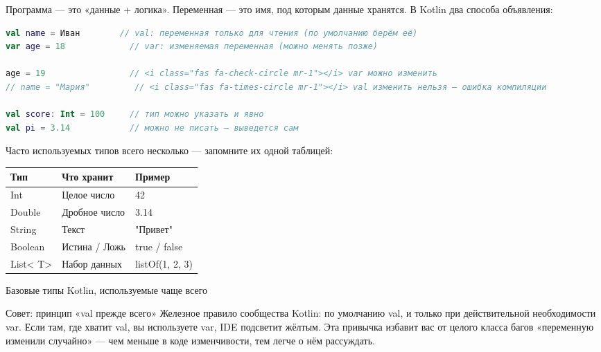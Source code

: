 


Программа — это «данные + логика». Переменная — это имя, под которым данные хранятся. В Kotlin два способа объявления:

\begin{lstlisting}[language=Kotlin]
val name = Иван        // val: переменная только для чтения (по умолчанию берём её)
var age = 18             // var: изменяемая переменная (можно менять позже)

age = 19                 // <i class="fas fa-check-circle mr-1"></i> var можно изменить
// name = "Мария"         // <i class="fas fa-times-circle mr-1"></i> val изменить нельзя — ошибка компиляции

val score: Int = 100     // тип можно указать и явно
val pi = 3.14            // можно не писать — выведется сам
\end{lstlisting}

Часто используемых типов всего несколько — запомните их одной таблицей:

\begin{center}
\begin{tabularx}{\linewidth}{|X|X|X|}
\hline
\textbf{Тип} & \textbf{Что хранит} & \textbf{Пример} \tabularnewline
\hline
Int & Целое число & 42 \tabularnewline
Double & Дробное число & 3.14 \tabularnewline
String & Текст & "Привет" \tabularnewline
Boolean & Истина / Ложь & true / false \tabularnewline
List< T> & Набор данных & listOf(1, 2, 3) \tabularnewline
\hline
\end{tabularx}
\end{center}

\begin{center}\small\color{gray}Базовые типы Kotlin, используемые чаще всего\end{center}

\begin{tcbinfo}{Совет: принцип «val прежде всего»}
Железное правило сообщества Kotlin: по умолчанию val, и только при действительной необходимости var. Если там, где хватит val, вы используете var, IDE подсветит жёлтым. Эта привычка избавит вас от целого класса багов «переменную изменили случайно» — чем меньше в коде изменчивости, тем легче о нём рассуждать.

\end{tcbinfo}

